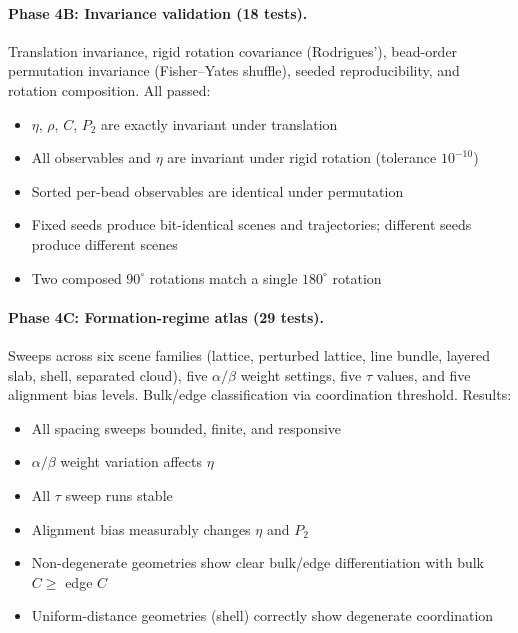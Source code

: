 \documentclass[11pt]{article}
\begin{document}
\paragraph{Phase 4B: Invariance validation (18 tests).}
Translation invariance, rigid rotation covariance (Rodrigues'),
bead-order permutation invariance (Fisher--Yates shuffle), seeded
reproducibility, and rotation composition.  All passed:
\begin{itemize}
    \item $\eta$, $\rho$, $C$, $P_2$ are exactly invariant under
          translation
    \item All observables and $\eta$ are invariant under rigid rotation
          (tolerance $10^{-10}$)
    \item Sorted per-bead observables are identical under permutation
    \item Fixed seeds produce bit-identical scenes and trajectories;
          different seeds produce different scenes
    \item Two composed $90^\circ$ rotations match a single $180^\circ$
          rotation
\end{itemize}

\paragraph{Phase 4C: Formation-regime atlas (29 tests).}
Sweeps across six scene families (lattice, perturbed lattice, line bundle,
layered slab, shell, separated cloud), five $\alpha/\beta$ weight settings,
five $\tau$ values, and five alignment bias levels.  Bulk/edge
classification via coordination threshold.  Results:
\begin{itemize}
    \item All spacing sweeps bounded, finite, and responsive
    \item $\alpha/\beta$ weight variation affects $\eta$
    \item All $\tau$ sweep runs stable
    \item Alignment bias measurably changes $\eta$ and $P_2$
    \item Non-degenerate geometries show clear bulk/edge differentiation
          with bulk $C \ge$ edge $C$
    \item Uniform-distance geometries (shell) correctly show degenerate
          coordination
\end{itemize}
\end{document}
